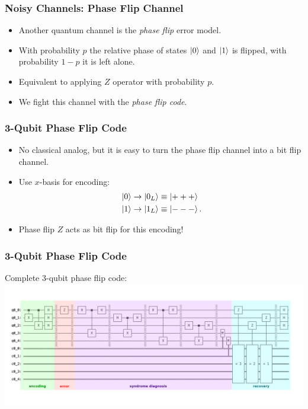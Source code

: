 \documentclass{beamer}
\begin{document}


\begin{frame}
    \frametitle{Noisy Channels: Phase Flip Channel}
    \begin{itemize}
        \item Another quantum channel is the \textit{phase flip} error model.
        \item With probability $p$ the relative phase of states $\left\vert{0}\right\rangle$ and $\left\vert{1}\right\rangle$ is flipped, with probability $1-p$ it is left alone.
        \item Equivalent to applying $Z$ operator with probability $p$.
        \item We fight this channel with the \textit{phase flip code}.
    \end{itemize}
\end{frame}

\begin{frame}
    \frametitle{3-Qubit Phase Flip Code}
    \begin{itemize}
        \item No classical analog, but it is easy to turn the phase flip channel into a bit flip channel.
        \item Use $x$-basis for encoding:
        \begin{align*}
            &\left\vert{0}\right\rangle \rightarrow \left\vert{0_L}\right\rangle \equiv \left\vert{+++}\right\rangle \\
            &\left\vert{1}\right\rangle \rightarrow \left\vert{1_L}\right\rangle \equiv \left\vert{---}\right\rangle.
        \end{align*}    
        \item Phase flip $Z$ acts as bit flip for this encoding!

    \end{itemize}
\end{frame}

\begin{frame}
    \frametitle{3-Qubit Phase Flip Code}
    Complete 3-qubit phase flip code:
    \centering
    \includegraphics[scale=0.15]{3qb-pf-circuit-color.png}
\end{frame}
\end{document}
